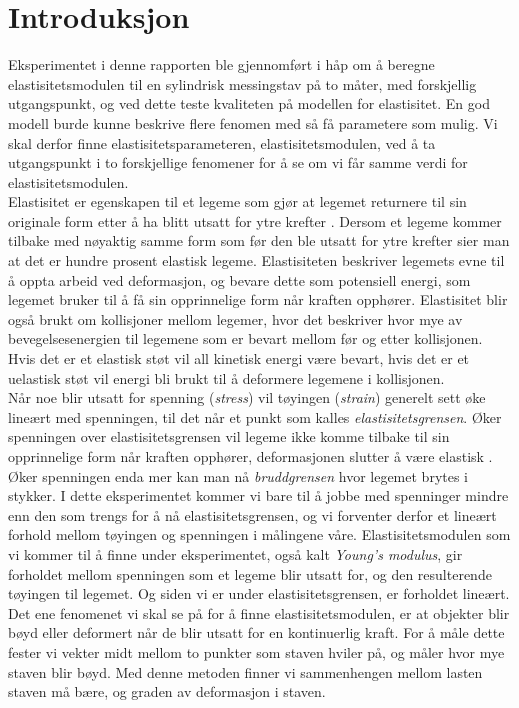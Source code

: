 \documentclass[%
 reprint,
 amsmath,amssymb,
 aps,
 norsk,
 booktabs
]{revtex4-1}
\begin{document}
\section{Introduksjon}
Eksperimentet i denne rapporten ble gjennomført i håp om å beregne elastisitetsmodulen til en sylindrisk messingstav på to måter, med forskjellig utgangspunkt, og ved dette teste kvaliteten på modellen for elastisitet. En god modell burde kunne beskrive flere fenomen med så få parametere som mulig. Vi skal derfor finne elastisitetsparameteren, elastisitetsmodulen, ved å ta utgangspunkt i to forskjellige fenomener for å se om vi får samme verdi for elastisitetsmodulen.\\
 Elastisitet er egenskapen til et legeme som gjør at legemet returnere til sin originale form etter å ha blitt utsatt  for ytre krefter \cite{gronn}. Dersom et legeme kommer tilbake med nøyaktig samme form som før den ble utsatt for ytre krefter sier man at det er hundre prosent elastisk legeme. Elastisiteten beskriver legemets evne til å oppta arbeid ved deformasjon, og bevare dette som potensiell energi, som legemet bruker til å få sin opprinnelige form når kraften opphører. Elastisitet blir også brukt om kollisjoner mellom legemer, hvor det beskriver hvor mye av bevegelsesenergien til legemene som er bevart mellom før og etter kollisjonen. Hvis det er et elastisk støt vil all kinetisk energi være bevart, hvis det er et uelastisk støt vil energi bli brukt til å deformere legemene i kollisjonen.\\
Når noe blir utsatt for spenning (\textit{stress}) vil tøyingen (\textit{strain}) generelt sett øke lineært med spenningen, til det når et punkt som kalles \textit{elastisitetsgrensen}. Øker spenningen over elastisitetsgrensen vil legeme ikke komme tilbake til sin opprinnelige form når kraften opphører, deformasjonen slutter å være elastisk  \cite{gronn}. Øker spenningen enda mer kan man nå \textit{bruddgrensen} hvor legemet brytes i stykker. I dette eksperimentet kommer vi bare til å jobbe med spenninger mindre enn den som trengs for å nå elastisitetsgrensen, og vi forventer derfor et lineært forhold mellom tøyingen og spenningen i målingene våre. Elastisitetsmodulen som vi kommer til å finne under eksperimentet, også kalt \textit{Young's modulus}, gir forholdet mellom spenningen som et legeme blir utsatt for, og den resulterende tøyingen til legemet. Og siden vi er under elastisitetsgrensen, er forholdet lineært.\\
Det ene fenomenet vi skal se på for å finne elastisitetsmodulen, er at objekter blir bøyd eller deformert når de blir utsatt for en kontinuerlig kraft. For å måle dette fester vi vekter midt mellom to punkter som staven hviler på, og måler hvor mye staven blir bøyd. Med denne metoden finner vi sammenhengen mellom lasten staven må bære, og graden av deformasjon i staven.\\
\end{document}
